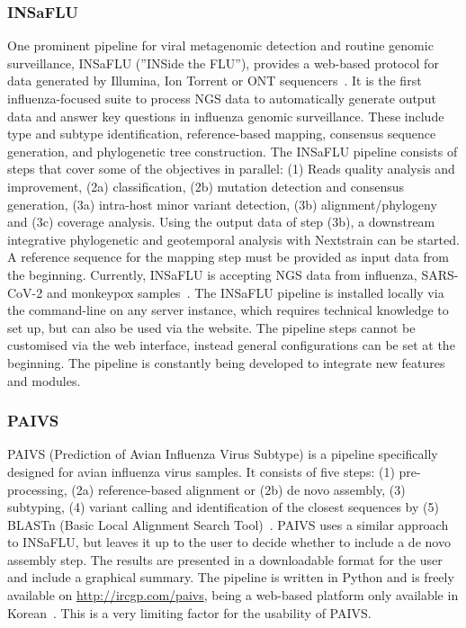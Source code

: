 \subsubsection{INSaFLU}
One prominent pipeline for viral metagenomic detection and routine genomic surveillance, INSaFLU (''INSide the FLU''), provides a web-based protocol for data generated by Illumina, Ion Torrent or ONT sequencers~\cite{borges2018insaflu}. It is the first influenza-focused suite to process NGS data to automatically generate output data and answer key questions in influenza genomic surveillance. These include type and subtype identification, reference-based mapping, consensus sequence generation, and phylogenetic tree construction. The INSaFLU pipeline consists of steps that cover some of the objectives in parallel: (1) Reads quality analysis and improvement, (2a) classification, (2b) mutation detection and consensus generation, (3a) intra-host minor variant detection, (3b) alignment/phylogeny and (3c) coverage analysis. Using the output data of step (3b), a downstream integrative phylogenetic and geotemporal analysis with Nextstrain can be started. A reference sequence for the mapping step must be provided as input data from the beginning. Currently, INSaFLU is accepting NGS data from influenza, SARS-CoV-2 and monkeypox samples~\cite{borges2018insaflu}. The INSaFLU pipeline is installed locally via the command-line on any server instance, which requires technical knowledge to set up, but can also be used via the website. The pipeline steps cannot be customised via the web interface, instead general configurations can be set at the beginning. The pipeline is constantly being developed to integrate new features and modules.

\subsubsection{PAIVS}
PAIVS (Prediction of Avian Influenza Virus Subtype) is a pipeline specifically designed for avian influenza virus samples. It consists of five steps: (1) pre-processing, (2a) reference-based alignment or (2b) de novo assembly, (3) subtyping, (4) variant calling and identification of the closest sequences by (5) BLASTn (Basic Local Alignment Search Tool)~\cite{park2020paivs}. PAIVS uses a similar approach to INSaFLU, but leaves it up to the user to decide whether to include a de novo assembly step. The results are presented in a downloadable format for the user and include a graphical summary. The pipeline is written in Python and is freely available on \url{http://ircgp.com/paivs}, being a web-based platform only available in Korean~\cite{park2020paivs}. This is a very limiting factor for the usability of PAIVS.


